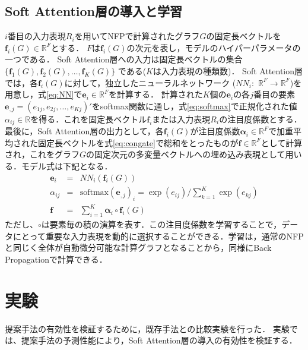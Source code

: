 \documentclass[twocolumn]{jarticle}
\begin{document}
\subsection{Soft Attention層の導入と学習}
$i$番目の入力表現$R_i$を用いてNFPで計算されたグラフ$G$の固定長ベクトルを$\bm{f}_i(G) \in \mathbb{R}^F$とする．
$F$は$\bm{f}_i(G)$の次元を表し，モデルのハイパーパラメータの一つである．
Soft Attention層への入力は固定長ベクトルの集合 $ \{\bm{f}_1(G),\bm{f}_2(G),\dots,\bm{f}_K(G)\}$ である($K$は入力表現の種類数)．
Soft Attention層では，各$\bm{f}_i(G)$に対して，独立したニューラルネットワーク ($NN_i:$ $\mathbb{R}^F \to \mathbb{R}^F$)を用意し，式\eqref{eq:NN}で$\bm{e}_i \in \mathbb{R}^F$を計算する．
計算された$K$個の$\bm{e}_i$の各$j$番目の要素$\bm{e}_{,j}=(e_{1j}, e_{2j},\dots,e_{Kj})'$をsoftmax関数に通し，式\eqref{eq:softmax}で正規化された値$\alpha_{ij}\in \mathbb{R}$を得る．これを固定長ベクトル$\bm{f}_i$または入力表現$R_i$の注目度係数とする．
最後に，Soft Attention層の出力として，各$\bm{f}_i(G)$が注目度係数$\bm{\alpha}_i \in \mathbb{R}^F$で加重平均された固定長ベクトルを式\eqref{eq:congate}で総和をとったものが$\bm{f} \in \mathbb{R}^F$として計算され，これをグラフ$G$の固定次元の多変量ベクトルへの埋め込み表現として用いる．モデル式は下記となる．
\begin{eqnarray}
	\label{eq:NN}
	\bm{e}_i &=& NN_i(\bm{f}_i(G)) \\
	\label{eq:softmax}
	\alpha_{ij} &=& \textstyle\mathrm{softmax}(\bm{e}_{,j})_i = \exp(e_{ij})/{\sum_{k=1}^{K}\exp(e_{kj})} \\
	\label{eq:congate}
	\bm{f}&=& \textstyle \sum_{i = 1}^{K} \bm{\alpha}_i \circ \bm{f}_i(G)
\end{eqnarray}
ただし、$\circ$は要素毎の積の演算を表す．この注目度係数を学習することで，データにとって重要な入力表現を動的に選択することができる．学習は，通常のNFPと同じく全体が自動微分可能な計算グラフとなることから，同様にBack Propagationで計算できる．

\vspace{-11pt}
\section{実験}
提案手法の有効性を検証するために，既存手法との比較実験を行った．
実験では、提案手法の予測性能により，Soft Attention層の導入の有効性を検証する．

\vspace{-7pt}
\end{document}
